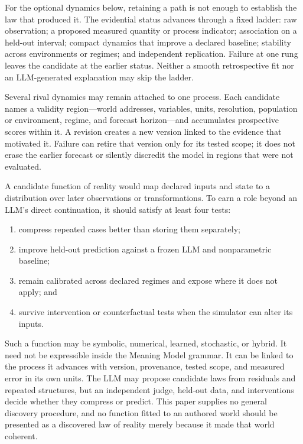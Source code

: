 \documentclass[10pt]{article}
\begin{document}
For the optional dynamics below, retaining a path is not enough to establish
the law that produced it. The evidential status advances through a fixed
ladder: raw observation; a proposed measured quantity or process
indicator; association on a held-out interval; compact dynamics that improve a
declared baseline; stability across environments or regimes; and independent
replication. Failure at one rung leaves the candidate at the earlier status.
Neither a smooth retrospective fit nor an LLM-generated explanation may skip
the ladder.

Several rival dynamics may remain attached to one process. Each candidate names
a validity region---world addresses, variables, units, resolution, population
or environment, regime, and forecast horizon---and accumulates prospective
scores within it. A revision creates a new version linked to the evidence that
motivated it. Failure can retire that version only for its tested scope; it
does not erase the earlier forecast or silently discredit the model in regions
that were not evaluated.

A candidate function of reality would map declared inputs and state to a
distribution over later observations or transformations. To earn a role beyond
an LLM's direct continuation, it should satisfy at least four tests:

\begin{enumerate}
  \item compress repeated cases better than storing them separately;
  \item improve held-out prediction against a frozen LLM and nonparametric
    baseline;
  \item remain calibrated across declared regimes and expose where it does not
    apply; and
  \item survive intervention or counterfactual tests when the simulator can
    alter its inputs.
\end{enumerate}

Such a function may be symbolic, numerical, learned, stochastic, or hybrid.
It need not be expressible inside the Meaning Model grammar. It can be linked
to the process it advances with version, provenance, tested scope, and measured
error in its own units.
The LLM may propose candidate laws from residuals and repeated structures, but
an independent judge, held-out data, and interventions decide whether they
compress or predict. This paper supplies no general discovery procedure, and no
function fitted to an authored world should be presented as a discovered law of reality
merely because it made that world coherent.
\end{document}
